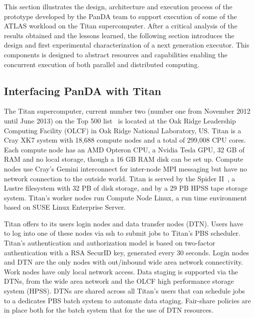 This section illustrates the design, architecture and execution process of the
prototype developed by the PanDA team to support execution of some of the ATLAS
workload on the Titan supercomputer. After a critical analysis of the results
obtained and the lessons learned, the following section introduces the design
and first experimental characterization of a next generation executor. This
components is designed to abstract resources and capabilities enabling the
concurrent execution of both parallel and distributed computing.


\subsection{Interfacing PanDA with Titan}
\label{ssec:panda_titan}

The Titan supercomputer, current number two (number one from November 2012 until
June 2013) on the Top 500 list~\cite{top500} is located at the Oak Ridge
Leadership Computing Facility (OLCF) in Oak Ridge National Laboratory, US\@.
Titan is a Cray XK7 system with 18,688 compute nodes and a total of 299,008 CPU
cores. Each compute node has an AMD Opteron CPU, a Nvidia Tesla GPU, 32 GB of
RAM and no local storage, though a 16 GB RAM disk can be set up. Compute nodes
use Cray’s Gemini interconnect for inter-node MPI messaging but have no network
connection to the outside world. Titan is served by the Spider
II~\cite{spider2}, a Lustre filesystem with 32 PB of disk storage, and by a 29
PB HPSS tape storage system. Titan’s worker nodes run Compute Node Linux, a run
time environment based on SUSE Linux Enterprise Server.


Titan offers to its users login nodes and data transfer nodes (DTN). Users have
to log into one of these nodes via ssh to submit jobs to Titan's PBS scheduler.
Titan's authentication and authorization model is based on two-factor
authentication with a RSA SecurID key, generated every 30 seconds. Login nodes
and DTN are the only nodes with out/inbound wide area network connectivity. Work
nodes have only local network access. Data staging is supported via the DTNs,
from the wide area network and the OLCF high performance storage system (HPSS).
DTNs are shared across all Titan's users that can schedule jobs to a dedicates
PBS batch system to automate data staging. Fair-share policies are in place both
for the batch system that for the use of DTN resources.

